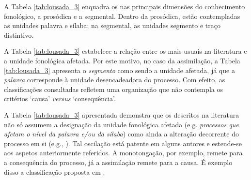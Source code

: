 \documentclass[output=paper]{LSP/langsci}
\begin{document}
A Tabela \ref{tab:lousada_3} enquadra os  nas principais dimensões do conhecimento fonológico, a prosódica e a segmental. Dentro da prosódica, estão contempladas as unidades palavra e sílaba; na segmental, as unidades segmento e traço distintivo.

A Tabela \ref{tab:lousada_3} estabelece a relação entre os  mais usuais na literatura e a unidade fonológica afetada. Por este motivo, no caso da assimilação, a Tabela \ref{tab:lousada_3} apresenta o \textit{segmento} como sendo a unidade afetada, já que a \textit{palavra} corresponde à unidade desencadeadora do processo. Com efeito, as classificações consultadas refletem uma organização que não contempla os critérios ‘causa’ \textit{versus} ‘consequência’. 

A Tabela \ref{tab:lousada_3} apresentada demonstra que os  descritos na literatura não só assumem a designação da unidade fonológica afetada (e.g. \textit{processos que afetam o nível da palavra e/ou da sílaba}) como ainda a alteração decorrente do processo em si (e.g., \textit{}). Tal oscilação está patente em alguns autores \citep{dodd_etal2003,miccioscarpino2008} e estende-se aos aspetos anteriormente referidos. A monotongação, por exemplo, remete para a consequência do processo, já a assimilação remete para a causa. É exemplo disso a classificação proposta em \citet{ingram1992}.
\end{document}
